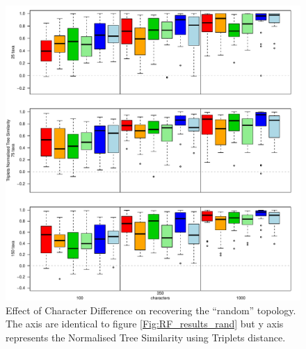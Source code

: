 \documentclass[12pt,letterpaper]{article}
\begin{document}
\begin{figure}[!htbp]
\centering
   \includegraphics[width=1\textwidth]{../Figures/Tr_results_null.pdf} %
\caption{Effect of Character Difference on recovering the ``random'' topology. The axis are identical to figure \ref{Fig:RF_results_rand} but y axis represents the Normalised Tree Similarity using Triplets distance.}
\label{Fig:Tr_results_rand}
\end{figure}
\end{document}
